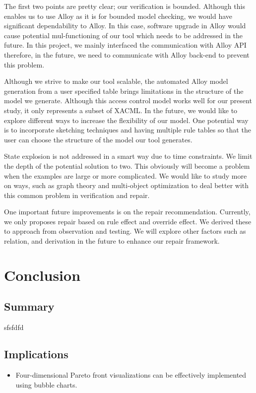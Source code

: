 \documentclass{acm_proc_article-sp}
\begin{document}
The first two points are pretty clear; our verification is bounded. Although this enables us to use Alloy as it is for bounded model checking, we would have significant dependability to Alloy. In this case, software upgrade in Alloy would cause potential mul-functioning of our tool which needs to be addressed in the future. In this project, we mainly interfaced the communication with Alloy API therefore, in the future, we need to communicate with Alloy back-end to prevent this problem.

Although we strive to make our tool scalable, the automated Alloy model generation from a user specified table brings limitations in the structure of the model we generate. Although this access control model works well for our present study, it only represents a subset of XACML. In the future, we would like to explore different ways to increase the flexibility of our model. One potential way is to incorporate sketching techniques and having multiple rule tables so that the user can choose the structure of the model our tool generates.

State explosion is not addressed in a smart way due to time constraints. We limit the depth of the potential solution to two. This obviously will become a problem when the examples are large or more complicated. We would like to study more on ways, such as graph theory and multi-object optimization to deal better with this common problem in verification and repair.

One important future improvements is on the repair recommendation. Currently, we only proposes repair based on rule effect and override effect. We derived these to approach from observation and testing. We will explore other factors such as relation, and derivation in the future to enhance our repair framework.

\section{Conclusion}

\subsection{Summary}

sfsfdfd

\subsection{Implications}

\begin{itemize}
\item Four-dimensional Pareto front visualizations can be effectively implemented using bubble charts.

\end{itemize}
\end{document}
